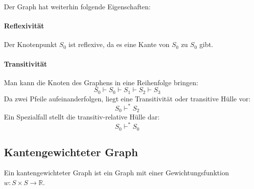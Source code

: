 \documentclass[../main.tex]{subfiles}
\begin{document}
            Der Graph hat weiterhin folgende Eigenschaften:
            
            \paragraph{Reflexivität}
                Der Knotenpunkt $S_0$ ist reflexive, da es eine Kante von $S_0$ zu $S_0$ gibt.
                
            \paragraph{Transitivität}
                Man kann die Knoten des Graphens in eine Reihenfolge bringen:
                \begin{equation}
                    S_0 \vdash S_0 \vdash S_1 \vdash S_2 \vdash S_3
                \end{equation}
                Da zwei Pfeile aufeinanderfolgen, liegt eine Transitivität oder transitive Hülle vor:
                \begin{equation}
                    S_0 \vdash^* S_2
                \end{equation}
                Ein Spezialfall stellt die transitiv-relative Hülle dar:
                \begin{equation}
                    S_0 \vdash^* S_0
                \end{equation}
                
        \subsection{Kantengewichteter Graph}
            Ein kantengewichteter Graph ist ein Graph mit einer Gewichtungsfunktion $w\colon S \times S \rightarrow \mathbb{R}$.
            
            \begin{center}
            \end{center}
            
\end{document}
